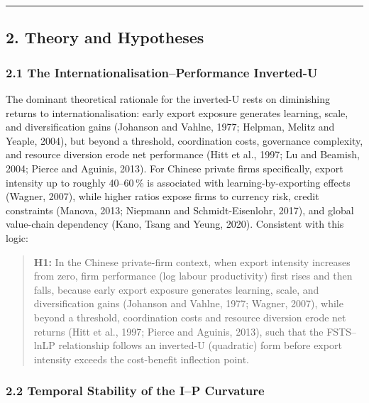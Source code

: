 \documentclass[12pt,a4paper]{article}
\begin{document}
\begin{center}\rule{0.5\linewidth}{0.5pt}\end{center}

\hypertarget{2-theory-and-hypotheses}{%
\subsection{2. Theory and Hypotheses}\label{2-theory-and-hypotheses}}

\hypertarget{21-the-internationalisationperformance-inverted-u}{%
\subsubsection{2.1 The Internationalisation--Performance
Inverted-U}\label{21-the-internationalisationperformance-inverted-u}}

The dominant theoretical rationale for the inverted-U rests on
diminishing returns to internationalisation: early export exposure
generates learning, scale, and diversification gains (Johanson and
Vahlne, 1977; Helpman, Melitz and Yeaple, 2004), but beyond a threshold,
coordination costs, governance complexity, and resource diversion erode
net performance (Hitt et al., 1997; Lu and Beamish, 2004; Pierce and
Aguinis, 2013). For Chinese private firms specifically, export intensity
up to roughly 40--60\,\% is associated with learning-by-exporting
effects (Wagner, 2007), while higher ratios expose firms to currency
risk, credit constraints (Manova, 2013; Niepmann and Schmidt-Eisenlohr,
2017), and global value-chain dependency (Kano, Tsang and Yeung, 2020).
Consistent with this logic:

\begin{quote}
\textbf{H1:} In the Chinese private-firm context, when export intensity
increases from zero, firm performance (log labour productivity) first
rises and then falls, because early export exposure generates learning,
scale, and diversification gains (Johanson and Vahlne, 1977; Wagner,
2007), while beyond a threshold, coordination costs and resource
diversion erode net returns (Hitt et al., 1997; Pierce and Aguinis,
2013), such that the FSTS--lnLP relationship follows an inverted-U
(quadratic) form before export intensity exceeds the cost-benefit
inflection point.
\end{quote}

\hypertarget{22-temporal-stability-of-the-ip-curvature}{%
\subsubsection{2.2 Temporal Stability of the I--P
Curvature}\label{22-temporal-stability-of-the-ip-curvature}}
\end{document}
